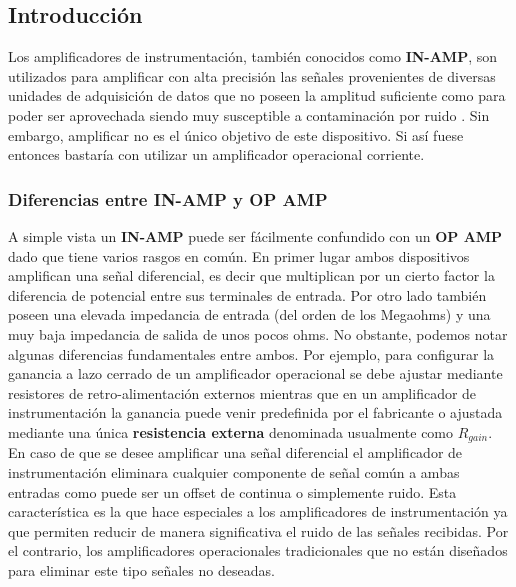 \documentclass[a4paper]{article}
\begin{document}
	\subsection{Introducción}
	Los amplificadores de instrumentación, también conocidos como \textbf{IN-AMP},  son utilizados para amplificar con alta precisión las señales provenientes de diversas unidades de adquisición de datos que no poseen la amplitud suficiente como para poder ser aprovechada siendo muy susceptible a contaminación por ruido . Sin embargo, amplificar no es el único objetivo de este dispositivo. Si así fuese entonces bastaría con utilizar un amplificador operacional corriente.
	\subsubsection{Diferencias entre \textbf{IN-AMP} y \textbf{OP AMP}}
	A simple vista un \textbf{IN-AMP} puede ser fácilmente confundido con un \textbf{OP AMP} dado que tiene varios rasgos en común. En primer lugar ambos dispositivos amplifican una señal diferencial, es decir que multiplican por un cierto factor la diferencia de potencial entre sus terminales de entrada. Por otro lado también poseen una elevada impedancia de entrada (del orden de los Megaohms) y una muy baja impedancia de salida de unos pocos ohms.
	No obstante, podemos notar algunas diferencias fundamentales entre ambos. Por ejemplo, para configurar la ganancia a lazo cerrado de un amplificador operacional se debe ajustar mediante resistores de retro-alimentación externos mientras que en un amplificador de instrumentación la ganancia puede venir predefinida por el fabricante o ajustada mediante una única \textbf{resistencia externa} denominada usualmente como \textbf{$R_{gain}$}.
	En caso de que se desee amplificar una señal diferencial el amplificador de instrumentación eliminara cualquier componente de señal común a ambas entradas como puede ser un offset de continua o simplemente ruido. Esta característica es la que hace especiales a los amplificadores de instrumentación ya que permiten reducir de manera significativa el ruido de las señales recibidas.  
	Por el contrario, los amplificadores operacionales tradicionales que no están diseñados para eliminar este tipo señales no deseadas.

	
\end{document}
